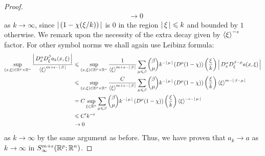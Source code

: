 \documentclass{article}
\begin{document}
\begin{proof}
\begin{align*}
    & \to 0
    \end{align*}
    as $k \to \infty$, since $\abs{( 1- \chi(\xi/ k))}$ is 0 in the region $\abs{\xi} \leq k$ and bounded by $1$ otherwise.  We remark upon the necessity of the extra decay given by $\sym[\xi]^{-\epsilon}$ factor. For other symbol norms we shall again use Leibinz formula: 
    \begin{align*}
    \sup_{(x, \xi) \in \R^p \times \R^n} \frac{\abs{D^\alpha_x D^\beta_\xi a_k(x, \xi)}}{\sym[\xi]^{m + \epsilon - \abs{\beta}}} 
    & \leq \sup_{(x, \xi) \in \R^p \times \R^n} \frac{1}{\sym[\xi]^{m + \epsilon - \abs{\beta}}} \sum_{\mu \leq \beta} \binom{\beta}{\mu}k^{-\abs{\mu}} \brac{D^\mu (1 - \chi)}\brac{\frac{\xi}{k}} \abs{D^\alpha_x D^{\beta - \mu}_\xi a(x, \xi) } \\
    & \leq  \sup_{(x, \xi) \in \R^p \times \R^n} \frac{C}{\sym[\xi]^{m + \epsilon - \abs{\beta}}} \sum_{\mu \leq \beta} \binom{\beta}{\mu}k^{-\abs{\mu}} \brac{D^\mu (1 - \chi)}\brac{\frac{\xi}{k}} \sym[\xi]^{m - \abs{\beta - \mu}}  \\
    & = C \sup_{\xi \in \R^n} \sum_{\mu \leq \beta} \binom{\beta}{\mu}k^{-\abs{\mu}} \brac{D^\mu (1 - \chi)}\brac{\frac{\xi}{k}} \sym[\xi]^{- \epsilon - \abs{\mu}}  \\
    & \leq C' k^{- \epsilon} \\
    & \to 0
    \end{align*}
    as $k \to \infty$ by the same argument as before. Thus, we have proven that $a_k \to a$ as $k \to \infty$ in $S^{m + \epsilon}_\infty(\R^p; \R^n)$. 
    
\end{proof}


\pagebreak
\end{document}
